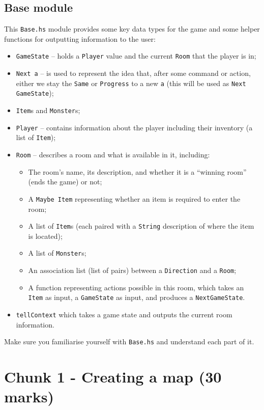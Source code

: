 \documentclass{article}
\begin{document}
\subsection{Base module}

This \texttt{Base.hs} module provides some key data types for
the game and some helper functions for outputting information
to the user:
%
\begin{itemize}
\item \texttt{GameState} -- holds a \texttt{Player} value and the
  current \texttt{Room} that the player is in;
%
\item \texttt{Next a} -- is used to represent the idea that,
after some command or action, either we stay the \texttt{Same} or
\texttt{Progress} to a new \texttt{a} (this will be used as \texttt{Next
  GameState});
%
\item \texttt{Item}s and \texttt{Monster}s;
\item \texttt{Player} -- contains information about the player
  including their inventory (a list of \texttt{Item});
\item \texttt{Room} -- describes a room and what is available
in it, including:
%
\begin{itemize}
\item The room's name, its description, and whether it is a ``winning
  room'' (ends the game) or not;
\item A \texttt{Maybe Item} representing whether an item is required to enter the room;
\item A list of \texttt{Item}s (each paired with a \texttt{String}
  description of where the item is located);
\item A list of \texttt{Monster}s;
\item An association list (list of pairs) between a \texttt{Direction}
  and a \texttt{Room};
\item A function representing actions possible in this room,
which takes an \texttt{Item} as input, a \texttt{GameState} as input,
and produces a \texttt{NextGameState}.
\end{itemize}
%
\item \texttt{tellContext} which takes a game state and outputs
the current room information.
\end{itemize}
%
Make sure you familiarise yourself with \texttt{Base.hs} and
understand each part of it.

\section*{Chunk 1 - Creating a map (30 marks)}
\end{document}
